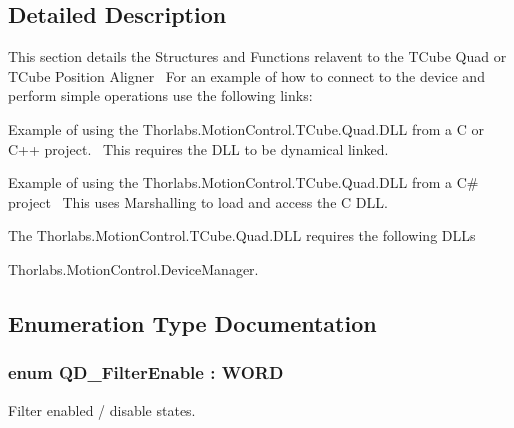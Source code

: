 \subsection{Detailed Description}
This section details the Structures and Functions relavent to the T\+Cube Quad or T\+Cube Position Aligner~\newline
 For an example of how to connect to the device and perform simple operations use the following links\+: 
\begin{DoxyItemize}
\item Example of using the Thorlabs.Motion\+Control.T\+Cube.Quad.D\+LL from a C or C++ project.~\newline
 This requires the D\+LL to be dynamical linked.  
\item Example of using the Thorlabs.Motion\+Control.T\+Cube.Quad.D\+LL from a C\# project~\newline
 This uses Marshalling to load and access the C D\+LL.  
\end{DoxyItemize}The Thorlabs.\+Motion\+Control.\+T\+Cube.\+Quad.\+D\+LL requires the following D\+L\+Ls 
\begin{DoxyItemize}
\item Thorlabs.\+Motion\+Control.\+Device\+Manager.  
\end{DoxyItemize}

\subsection{Enumeration Type Documentation}
\subsubsection[{\texorpdfstring{Q\+D\+\_\+\+Filter\+Enable}{QD_FilterEnable}}]{\setlength{\rightskip}{0pt plus 5cm}enum {\bf Q\+D\+\_\+\+Filter\+Enable} \+: W\+O\+RD}\hypertarget{group___t_cube_quad_gaf9cb69779549db4792c4e647b69eb29f}{}\label{group___t_cube_quad_gaf9cb69779549db4792c4e647b69eb29f}


Filter enabled / disable states. 

